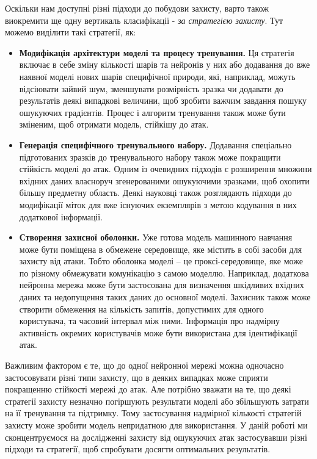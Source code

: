 \documentclass[14pt,a4paper]{extarticle}
\newcounter{e}
\numberwithin{equation}{section}
\numberwithin{figure}{section}
\begin{document}
 Оскільки нам доступні різні підходи до побудови захисту, варто також виокремити ще одну вертикаль класифікації - \textit{за стратегією захисту}. Тут можемо виділити такі стратегії, як:
 
 \begin{itemize}
 	\item \textbf{Модифікація архітектури моделі та процесу тренування.} Ця стратегія включає в себе зміну кількості шарів та нейронів у них або додавання до вже наявної моделі нових шарів специфічної природи, які, наприклад, можуть відсіювати зайвий шум, зменшувати розмірність зразка чи додавати до результатів деякі випадкові величини, щоб зробити важчим завдання пошуку ошукуючих градієнтів. Процес і алгоритм тренування також може бути зміненим, щоб отримати модель, стійкішу до атак.
 	
 	\item \textbf{Генерація специфічного тренувального набору.} Додавання спеціально підготованих зразків до тренувального набору також може покращити стійкість моделі до атак. Одним із очевидних підходів є розширення множини вхідних даних власноруч згенерованими ошукуючими зразками, щоб охопити більшу предметну область. Деякі науковці також розглядають підходи до модифікації міток для вже існуючих екземплярів з метою кодування в них додаткової інформації.
 	
 	\item \textbf{Створення захисної оболонки.} Уже готова модель машинного навчання може бути поміщена в обмежене середовище, яке містить в собі засоби для захисту від атаки. Тобто оболонка моделі -- це проксі-середовище, яке може по різному обмежувати комунікацію з самою моделлю. Наприклад, додаткова нейронна мережа може бути застосована для визначення шкідливих вхідних даних та недопущення таких даних до основної моделі. Захисник також може створити обмеження на кількість запитів, допустимих для одного користувача, та часовий інтервал між ними. Інформація про надмірну активність окремих користувачів може бути використана для ідентифікації атак.
 \end{itemize}
 
 Важливим фактором є те, що до одної нейронної мережі можна одночасно застосовувати різні типи захисту, що в деяких випадках може сприяти покращенню стійкості мережі до атак. Але потрібно зважати на те, що деякі стратегії захисту незначно погіршують результати моделі або збільшують затрати на її тренування та підтримку. Тому застосування надмірної кількості стратегій захисту може зробити модель непридатною для використання. У даній роботі ми сконцентруємося на дослідженні захисту від ошукуючих атак застосувавши різні підходи та стратегії, щоб спробувати досягти оптимальних результатів.
 
\end{document}
